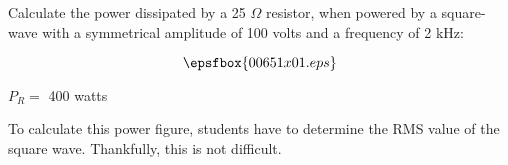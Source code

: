 

Calculate the power dissipated by a 25 $\Omega$ resistor, when powered by a square-wave with a symmetrical amplitude of 100 volts and a frequency of 2 kHz:

$$\epsfbox{00651x01.eps}$$







$P_R =$ 400 watts







To calculate this power figure, students have to determine the RMS value of the square wave.  Thankfully, this is not difficult.




